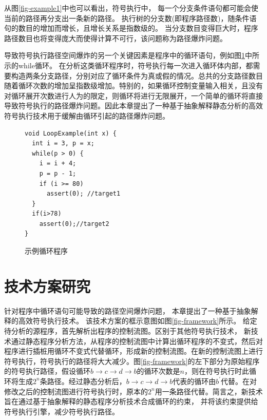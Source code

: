 从图\ref{fig-example1}中也可以看出，符号执行中，
每一个分支条件语句都可能会使当前的路径再分支出一条新的路径。
执行树的分支数(即程序路径数)，随条件语句的数目的增加而增长，且增长关系是指数级的。
当分支数目变得巨大时，程序路径数目也将变得庞大而使得计算不可行，该问题称为路径爆炸问题。

导致符号执行路径空间爆炸的另一个关键因素是程序中的循环语句，例如图\ref{fig-example2}中所示的while循环。
在分析这类循环程序时，符号执行每一次进入循环体内部，都需要构造两条分支路径，分别对应了循环条件为真或假的情况。总共的分支路径数目随着循环次数的增加呈指数级增加。特别的，如果循环控制变量输入相关，且没有对循环展开次数进行人为的限定，则循环将进行无限展开，一个简单的循环将直接导致符号执行的路径爆炸问题。因此本章提出了一种基于抽象解释静态分析的高效符号执行技术用于缓解由循环引起的路径爆炸问题。


\begin{figure}[h]
\begin{lstlisting}
void LoopExample(int x) {
  int i = 3, p = x;
  while(p > 0) {
    i = i + 4;
    p = p - 1;
	if (i >= 80)
	  assert(0); //target1
  }
  if(i>78)
  	assert(0);//target2
}
\end{lstlisting}
\caption{示例循环程序}
\label{fig-example2}
\end{figure}

\section{技术方案研究}
针对程序中循环语句可能导致的路径空间爆炸问题，
本章提出了一种基于抽象解释的高效符号执行技术。
该技术方案的框示意图如图\ref{fig-framework}所示。
给定待分析的源程序，首先解析出程序的控制流图。区别于其他符号执行技术，
新技术通过静态程序分析方法，从程序的控制流图中计算出循环程序的不变式，然后对程序进行插桩用循环不变式代替循环，形成新的控制流图。在新的控制流图上进行符号执行，符号执行的路径将大大减少。图\ref{fig-framework}的左下部分为原始程序的符号执行路径，假设循环$b \rightarrow c \rightarrow d \rightarrow b$的循环次数是$n$，则在符号执行时此循环将生成$2^{n}$条路径。经过静态分析后，$b \rightarrow c \rightarrow d \rightarrow b$代表的循环由$b^{'}$代替。在对修改之后的控制流图进行符号执行时，原本的$2^{n}$用一条路径代替。简言之，新技术旨在通过基于抽象解释的静态程序分析技术合成循环的约束，
并将该约束提供给符号执行引擎，减少符号执行路径。

